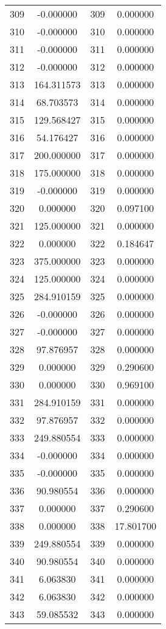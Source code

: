 \documentclass[12pt]{article}
\begin{document}
\begin{longtable}{@{}cccc@{}}
309 & -0.000000 & 309 & 0.000000 \\
310 & -0.000000 & 310 & 0.000000 \\
311 & -0.000000 & 311 & 0.000000 \\
312 & -0.000000 & 312 & 0.000000 \\
313 & 164.311573 & 313 & 0.000000 \\
314 & 68.703573 & 314 & 0.000000 \\
315 & 129.568427 & 315 & 0.000000 \\
316 & 54.176427 & 316 & 0.000000 \\
317 & 200.000000 & 317 & 0.000000 \\
318 & 175.000000 & 318 & 0.000000 \\
319 & -0.000000 & 319 & 0.000000 \\
320 & 0.000000 & 320 & 0.097100 \\
321 & 125.000000 & 321 & 0.000000 \\
322 & 0.000000 & 322 & 0.184647 \\
323 & 375.000000 & 323 & 0.000000 \\
324 & 125.000000 & 324 & 0.000000 \\
325 & 284.910159 & 325 & 0.000000 \\
326 & -0.000000 & 326 & 0.000000 \\
327 & -0.000000 & 327 & 0.000000 \\
328 & 97.876957 & 328 & 0.000000 \\
329 & 0.000000 & 329 & 0.290600 \\
330 & 0.000000 & 330 & 0.969100 \\
331 & 284.910159 & 331 & 0.000000 \\
332 & 97.876957 & 332 & 0.000000 \\
333 & 249.880554 & 333 & 0.000000 \\
334 & -0.000000 & 334 & 0.000000 \\
335 & -0.000000 & 335 & 0.000000 \\
336 & 90.980554 & 336 & 0.000000 \\
337 & 0.000000 & 337 & 0.290600 \\
338 & 0.000000 & 338 & 17.801700 \\
339 & 249.880554 & 339 & 0.000000 \\
340 & 90.980554 & 340 & 0.000000 \\
341 & 6.063830 & 341 & 0.000000 \\
342 & 6.063830 & 342 & 0.000000 \\
343 & 59.085532 & 343 & 0.000000 \\

\end{longtable}
\end{document}
